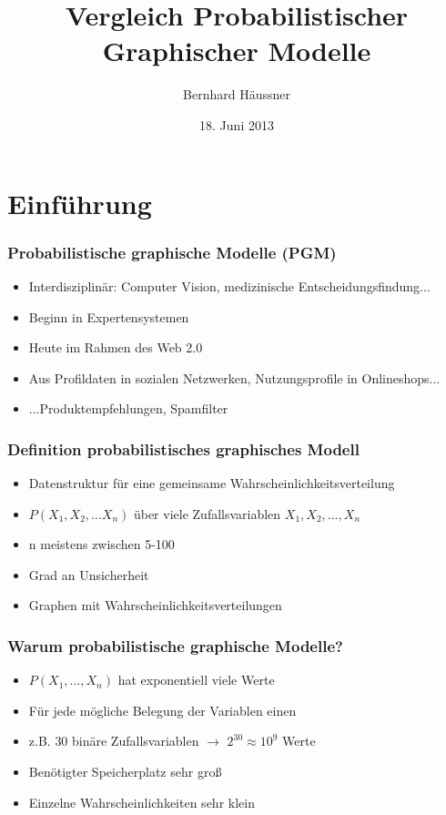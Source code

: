 \documentclass{beamer}
\title{Vergleich Probabilistischer Graphischer Modelle}
\author{Bernhard Häussner}
\date{18. Juni 2013}
\begin{document}
\maketitle
 
\section{Einführung}
\frame{\tableofcontents[currentsection]}

\begin{frame}
  \frametitle{Probabilistische graphische Modelle (PGM)}
  \begin{itemize}
    \item Interdisziplinär: Computer Vision, medizinische Entscheidungsfindung...
    \item Beginn in Expertensystemen
    \item Heute im Rahmen des Web 2.0
    \item Aus Profildaten in sozialen Netzwerken, Nutzungsprofile in Onlineshops...
    \item ...Produktempfehlungen, Spamfilter
  \end{itemize}
\end{frame}

\begin{frame}
  \frametitle{Definition probabilistisches graphisches Modell}
  \begin{itemize}
    \item Datenstruktur für eine gemeinsame Wahrscheinlichkeitsverteilung
    \item $P(X_1, X_2, ... X_n)$ über viele Zufallsvariablen $X_1,X_2,\dots,X_n$ 
    \item n meistens zwischen 5-100
    \item Grad an Unsicherheit 
    \item Graphen mit Wahrscheinlichkeitsverteilungen
  \end{itemize}
\end{frame}

\begin{frame}
  \frametitle{Warum probabilistische graphische Modelle?}
  \begin{itemize}
    \item $P(X_1, ..., X_n)$ hat exponentiell viele Werte
    \item Für jede mögliche Belegung der Variablen einen
    \item z.B. $30$ binäre Zufallsvariablen $\rightarrow$ $2^{30} \approx 10^9 $ Werte
    \item Benötigter Speicherplatz sehr groß
    \item Einzelne Wahrscheinlichkeiten sehr klein
  \end{itemize}
\end{frame}
\end{document}

